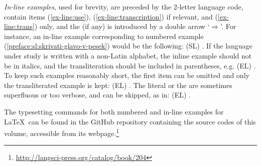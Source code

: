\documentclass[output=paper,
modfonts,
]{langscibook}
\begin{document}




\emph{In-line examples}, used for brevity, are preceded by the 2-letter language code, contain items (\ref{ex-line:use}), (\ref{ex-line:transcription}) if relevant, and (\ref{ex-line:trans}) only, and the  (if any) is introduced by a double arrow `$\Rightarrow$'. For instance, an in-line example corresponding to numbered example (\ref{preface:sl:skrivati-glavo-v-pesek}) would be the following: (SL) . 
%
If the language under study is written with a non-Latin alphabet, the inline example should not be in italics, and the transliteration should be included in parentheses, e.g. (EL) . To keep such examples reasonably short, the first item can be omitted and only the transliterated example is kept: (EL) . 
%
The literal or the  are sometimes superfluous or too verbose, and can be skipped, as in:  (EL) . 

The typesetting commands for both numbered and in-line examples for \LaTeX~can be found in the GitHub repository containing the source codes of this volume, accessible from its webpage.\footnote{\url{http://langsci-press.org/catalog/book/204}} %

\end{document}
